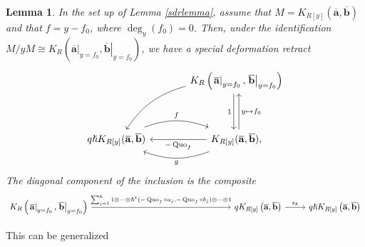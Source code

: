 \documentclass{article}
\DeclareMathOperator{\Quo}{Quo}
\theoremstyle{plain} %
\newtheorem{lemma}[theorem]{Lemma}
\theoremstyle{definition} %
\theoremstyle{remark} %
\begin{document}
\begin{lemma}\label{lemma:sdrkoszullinear}
    In the set up of Lemma \ref{sdrlemma}, assume that $M=K_{R[y]}(\mathbf{\overline a},\mathbf{\overline b})$
    and that 
    $f=y-f_0$, where $\deg_y(f_0)=0$. Then, under the identification 
    $M/yM\cong K_{R}\left(\left.\mathbf{\overline a}\right|_{y=f_0},\left.\mathbf{\overline b}\right|_{y=f_0}\right)$,
    we have a special deformation retract
     $$
\begin{tikzcd}[column sep=large]
    &
    K_{R}\left(\left.\mathbf{\overline a}\right|_{y=f_0},\left.\mathbf{\overline b}\right|_{y=f_0}\right)
    \ar[dd, shift right=0.6ex, "1", swap]
    \ar[dd, leftarrow, shift left=0.6ex, "y\mapsto f_0"]
    \arrow[ddl, "{}", bend right=20, swap]
    \\\\
    q\hslash K_{R[y]}(\mathbf{\overline a},\mathbf{\overline b})
    \arrow[r, "f", shift left=0.5ex, bend left=20]
    & 
    K_{R[y]}(\mathbf{\overline a},\mathbf{\overline b})
    \ar[l, "-\Quo_f"]
    \arrow[l, "g", shift left=0.5ex, bend left=20], 
\end{tikzcd}
$$
The diagonal component of the inclusion is the composite
$$
\begin{tikzcd}
    K_{R}\left(\left.\mathbf{\overline a}\right|_{y=f_0},\left.\mathbf{\overline b}\right|_{y=f_0}\right) \arrow[r, "{\sum_{j=1}^k1\otimes\cdots \otimes\hslash^1(-\Quo_f\circ a_j,-\Quo_f\circ b_j)\otimes\cdots\otimes 1}"] 
    &[5cm]
    qK_{R[y]}\left(\mathbf{\overline a},\mathbf{\overline b}\right) 
    \arrow[r,"s_\hslash"] 
    & 
    q\hslash K_{R[y]}\left(\mathbf{\overline a},\mathbf{\overline b}\right)
\end{tikzcd}
$$
\end{lemma}

This can be generalized 
\end{document}
